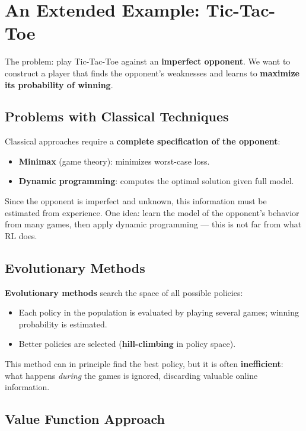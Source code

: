 \documentclass[11pt,a4paper]{article}
\theoremstyle{definition}
\theoremstyle{plain}
\theoremstyle{remark}
\begin{document}
\section{An Extended Example: Tic-Tac-Toe}

The problem: play Tic-Tac-Toe against an \textbf{imperfect opponent}. We want to construct a player that finds the opponent's weaknesses and learns to \textbf{maximize its probability of winning}.

\subsection{Problems with Classical Techniques}

Classical approaches require a \textbf{complete specification of the opponent}:
\begin{itemize}
    \item \textbf{Minimax} (game theory): minimizes worst-case loss.
    \item \textbf{Dynamic programming}: computes the optimal solution given full model.
\end{itemize}

Since the opponent is imperfect and unknown, this information must be estimated from experience. One idea: learn the model of the opponent's behavior from many games, then apply dynamic programming — this is not far from what RL does.

\subsection{Evolutionary Methods}

\textbf{Evolutionary methods} search the space of all possible policies:
\begin{itemize}
    \item Each policy in the population is evaluated by playing several games; winning probability is estimated.
    \item Better policies are selected (\textbf{hill-climbing} in policy space).
\end{itemize}

This method can in principle find the best policy, but it is often \textbf{inefficient}: what happens \textit{during} the games is ignored, discarding valuable online information.

\subsection{Value Function Approach}
\end{document}

